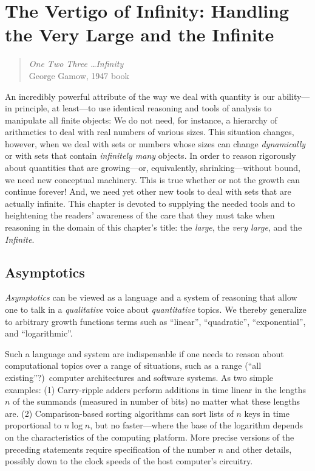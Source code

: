 
\chapter{The Vertigo of Infinity:
Handling the Very Large and the Infinite}
\label{ch:infinity}

\begin{quote}
{\em One Two Three \ldots Infinity} \\
\hspace*{1in}George Gamow, 1947 book
\end{quote}

\noindent
An incredibly powerful attribute of the way we deal with quantity is
our ability---in principle, at least---to use identical reasoning and
tools of analysis to manipulate all finite objects: We do not need,
for instance, a hierarchy of arithmetics to deal with real numbers of
various sizes.  This situation changes, however, when we deal with
sets or numbers whose sizes can change {\em dynamically} or with sets
that contain {\em infinitely many} objects.  In order to reason
rigorously about quantities that are growing---or, equivalently,
shrinking---without bound, we need new conceptual machinery.  This is
true whether or not the growth can continue forever!  And, we need yet
other new tools to deal with sets that are actually infinite.  This
chapter is devoted to supplying the needed tools and to heightening
the readers' awareness of the care that they must take when reasoning
in the domain of this chapter's title: the {\em large}, the {\em very
  large}, and the {\em Infinite}.



\section{Asymptotics}
\label{sec:asymptotics}

{\em Asymptotics}  can be viewed as a language and
a system of reasoning that allow one to talk in a {\em qualitative}
voice about {\em quantitative} topics.  We thereby generalize to
arbitrary growth functions terms such as ``linear'', ``quadratic'',
``exponential'', and ``logarithmic''.

Such a language and system are indispensable if one needs to reason
about computational topics over a range of situations, such as a range
(``all existing''?)~computer architectures and software systems.  As
two simple examples: (1) Carry-ripple adders perform additions in time
linear in the lengths $n$ of the summands (measured in number of bits)
no matter what these lengths are. (2) Comparison-based sorting
algorithms can sort lists of $n$ keys in time proportional to $n \log
n$, but no faster---where the base of the logarithm depends on the
characteristics of the computing platform.  More precise versions of
the preceding statements require specification of the number $n$ and
other details, possibly down to the clock speeds of the host
computer's circuitry.

